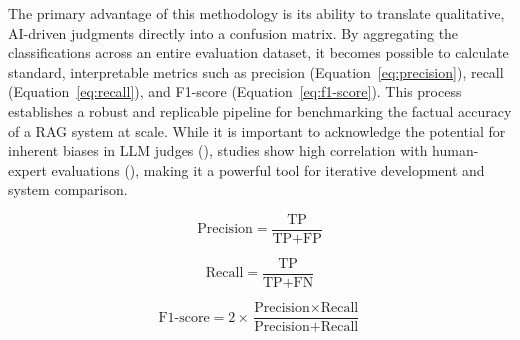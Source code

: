             The primary advantage of this methodology is its ability to translate qualitative, AI-driven judgments directly into a confusion matrix. By aggregating the classifications across an entire evaluation dataset, it becomes possible to calculate standard, interpretable metrics such as precision (Equation~\ref{eq:precision}), recall (Equation~\ref{eq:recall}), and F1-score (Equation~\ref{eq:f1-score}). This process establishes a robust and replicable pipeline for benchmarking the factual accuracy of a RAG system at scale. While it is important to acknowledge the potential for inherent biases in LLM judges (\citep{Gu2025}), studies show high correlation with human-expert evaluations (\citep{li2024llmsasjudgescomprehensivesurveyllmbased}), making it a powerful tool for iterative development and system comparison.

            \begin{equation}
                \text{Precision} = \frac{\text{TP}}{\text{TP} + \text{FP}}
                \label{eq:precision}
            \end{equation}

            \begin{equation}
                \text{Recall} = \frac{\text{TP}}{\text{TP} + \text{FN}}
                \label{eq:recall}
            \end{equation}

            \begin{equation}
                \text{F1-score} = 2 \times \frac{\text{Precision} \times \text{Recall}}{\text{Precision} + \text{Recall}}
                \label{eq:f1-score}
            \end{equation}


